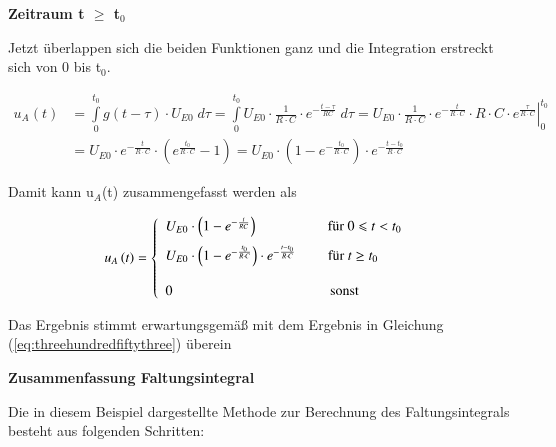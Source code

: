 {\selectfont
\noindent\textbf{Zeitraum t $\geqslant $ t$_{0}$}}\smallskip

\noindent Jetzt überlappen sich die beiden Funktionen ganz und die Integration erstreckt sich von 0 bis t$_{0}$.

\begin{equation}\label{eq:threehundredseventynine}
\begin{split}
u_{A} \left(t\right) & = \int\limits _{0}^{t_{0} }g\left(t-\tau \right)\cdot U_{E0} \;d\tau  =\int\limits _{0}^{t_{0} }U_{E0} \cdot \frac{1}{R\cdot C} \cdot e^{-\frac{t-\tau }{RC} } \; d\tau  =\left. U_{E0} \cdot \frac{1}{R\cdot C} \cdot e^{-\frac{t}{R\cdot C} } \cdot R\cdot C\cdot e^{\frac{\tau }{R\cdot C} } \right|_{0}^{t_{0}} \\ 
& = U_{E0} \cdot e^{-\frac{t}{R\cdot C}} \cdot (e^{\frac{t_{0}}{R\cdot C}}-1) = U_{E0} \cdot (1-e^{-\frac{t_{0}}{R\cdot C}}) \cdot e^{-\frac{t-t_{0}}{R\cdot C}}
\end{split}
\end{equation}

\noindent Damit kann u$_{A}$(t) zusammengefasst werden als

\begin{equation}\label{eq:threehundredeighty}
\begin{split}
u_{A} \left(t\right)=\left\{\begin{array}{l} 
{U_{E0} \cdot \left(1-e^{-\frac{t}{RC} } \right) \qquad \qquad \quad \text{für } 0\leqslant t<t_{0} }\medskip \\ 
{U_{E0} \cdot \left(1-e^{-\frac{t_{0} }{R\cdot C}} \right)\cdot e^{-\frac{t-t_{0} }{R\cdot C}} \qquad \; \text{für } t \ge t_{0\qquad } } \\ 
{} \\ 0 \; \qquad \qquad \qquad \qquad \qquad \quad \text{sonst} 
\end{array}\right.
\end{split}
\end{equation}

\noindent Das Ergebnis stimmt erwartungsgemäß mit dem Ergebnis in Gleichung (\ref{eq:threehundredfiftythree}) überein\bigskip

{\selectfont
\noindent\textbf{Zusammenfassung Faltungsintegral}}\smallskip

\noindent Die in diesem Beispiel dargestellte Methode zur Berechnung des Faltungsintegrals besteht aus folgenden Schritten:


